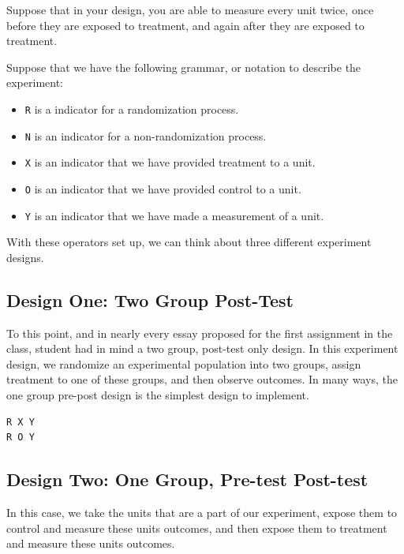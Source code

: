 \documentclass[
]{book}
\providecommand{\tightlist}{%
  \setlength{\itemsep}{0pt}\setlength{\parskip}{0pt}}
\begin{document}
Suppose that in your design, you are able to measure every unit twice,
once before they are exposed to treatment, and again after they are
exposed to treatment.

Suppose that we have the following grammar, or notation to describe the
experiment:

\begin{itemize}
\tightlist
\item
  \texttt{R} is a indicator for a randomization process.
\item
  \texttt{N} is an indicator for a non-randomization process.
\item
  \texttt{X} is an indicator that we have provided treatment to a unit.
\item
  \texttt{O} is an indicator that we have provided control to a unit.
\item
  \texttt{Y} is an indicator that we have made a measurement of a unit.
\end{itemize}

With these operators set up, we can think about three different
experiment designs.

\hypertarget{design-one-two-group-post-test}{%
\subsection{Design One: Two Group
Post-Test}\label{design-one-two-group-post-test}}

To this point, and in nearly every essay proposed for the first
assignment in the class, student had in mind a two group, post-test only
design. In this experiment design, we randomize an experimental
population into two groups, assign treatment to one of these groups, and
then observe outcomes. In many ways, the one group pre-post design is
the simplest design to implement.

\begin{verbatim}
R X Y 
R O Y
\end{verbatim}

\hypertarget{design-two-one-group-pre-test-post-test}{%
\subsection{Design Two: One Group, Pre-test
Post-test}\label{design-two-one-group-pre-test-post-test}}

In this case, we take the units that are a part of our experiment,
expose them to control and measure these units outcomes, and then expose
them to treatment and measure these units outcomes.
\end{document}
